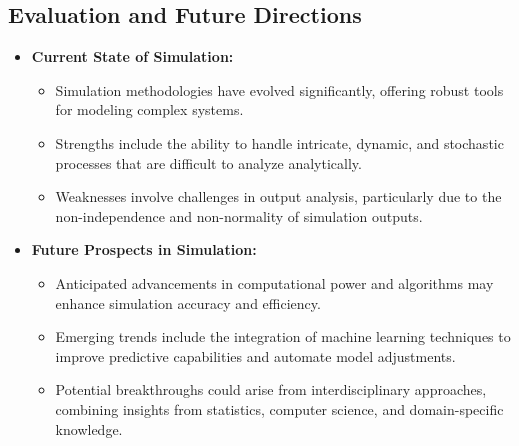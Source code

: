 
\subsection{Evaluation and Future Directions}

\begin{itemize}
    \item \textbf{Current State of Simulation:} 
    \begin{itemize}
        \item Simulation methodologies have evolved significantly, offering robust tools for modeling complex systems.
        \item Strengths include the ability to handle intricate, dynamic, and stochastic processes that are difficult to analyze analytically.
        \item Weaknesses involve challenges in output analysis, particularly due to the non-independence and non-normality of simulation outputs.
    \end{itemize}
    
    \item \textbf{Future Prospects in Simulation:} 
    \begin{itemize}
        \item Anticipated advancements in computational power and algorithms may enhance simulation accuracy and efficiency.
        \item Emerging trends include the integration of machine learning techniques to improve predictive capabilities and automate model adjustments.
        \item Potential breakthroughs could arise from interdisciplinary approaches, combining insights from statistics, computer science, and domain-specific knowledge.
    \end{itemize}
\end{itemize}

